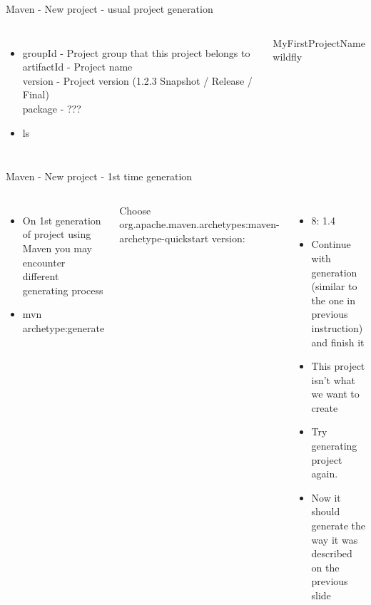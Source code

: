 \documentclass[aspectratio=1610,english]{beamer} %
\begin{document}
\begin{frame}{Maven - New project - usual project generation}
\begin{columns}
 				\begin{itemize}
					\tiny
					\color{red}
					\item groupId - Project group that this project belongs to \\
						artifactId - Project name \\
						version - Project version (1.2.3 Snapshot / Release / Final) \\
						package - ???				
					\color{black}
					\item ls
				\end{itemize}
				\fontsize{4}{5} \selectfont
				MyFirstProjectName \\
					wildfly
		\end{columns}
	\end{frame}
	\begin{frame}{Maven - New project - 1st time generation}
		\begin{columns}
				\begin{itemize}
					\small
					\color{black}
					\item On 1st generation of project using Maven you may encounter different generating process 
					\item mvn archetype:generate
				\end{itemize}
				\tiny
				Choose org.apache.maven.archetypes:maven-archetype-quickstart version: 
				\begin{itemize}
					\small
					\color{black}
					\item 8: 1.4
					\item Continue with generation (similar to the one in previous instruction) and finish it 
					\item This project isn't what we want to create 
					\item Try generating project again. 
					\item Now it should generate the way it was described on the previous slide
				\end{itemize}
				\tiny 
		\end{columns}
	\end{frame}
\end{document}
